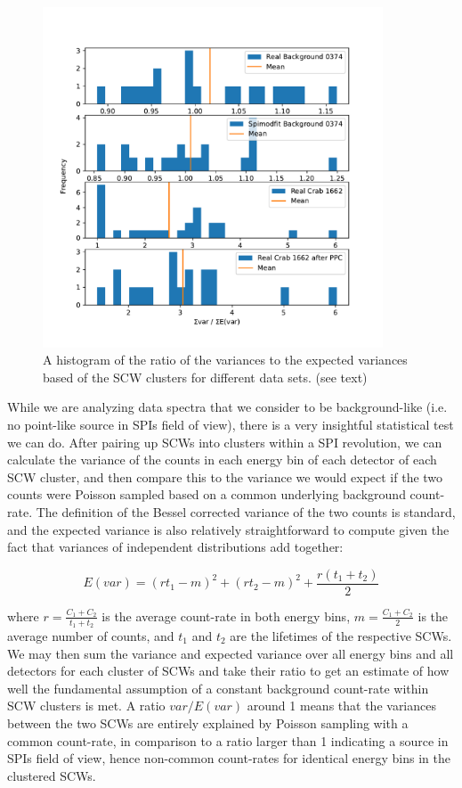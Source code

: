 \documentclass{article}
\begin{document}
\begin{figure}[h]
    \centering
    \includegraphics[width=0.9\textwidth]{Images/background_variance.pdf}
    \caption{A histogram of the ratio of the variances to the expected variances based of the SCW clusters for different data sets. (see text)}
    \label{plt bkg var}
\end{figure}

While we are analyzing data spectra that we consider to be background-like (i.e. no point-like source in SPIs field of view), there is a very insightful statistical test we can do. After pairing up SCWs into clusters within a SPI revolution, we can calculate the variance of the counts in each energy bin of each detector of each SCW cluster, and then compare this to the variance we would expect if the two counts were Poisson sampled based on a common underlying background count-rate. The definition of the Bessel corrected variance of the two counts is standard, and the expected variance is also relatively straightforward to compute given the fact that variances of independent distributions add together:

\begin{equation}
    E(var) = (rt_1 - m)^2 + (rt_2 - m)^2 + \frac{r(t_1+t_2)}{2}
\end{equation}

where $r=\frac{C_1+C_2}{t_1+t_2}$ is the average count-rate in both energy bins, $m=\frac{C_1+C_2}{2}$ is the average number of counts, and $t_1$ and $t_2$ are the lifetimes of the respective SCWs. We may then sum the variance and expected variance over all energy bins and all detectors for each cluster of SCWs and take their ratio to get an estimate of how well the fundamental assumption of a constant background count-rate within SCW clusters is met. A ratio $var / E(var)$ around 1 means that the variances between the two SCWs are entirely explained by Poisson sampling with a common count-rate, in comparison to a ratio larger than 1 indicating a source in SPIs field of view, hence non-common count-rates for identical energy bins in the clustered SCWs.
\end{document}
